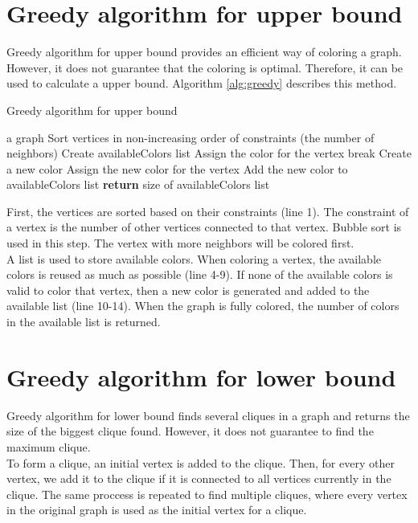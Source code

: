 \documentclass[a4paper]{report}
\begin{document}
		\section{Greedy algorithm for upper bound}
		Greedy algorithm for upper bound \cite{greedy} provides an efficient way of coloring a graph. However, it does not guarantee that the coloring is optimal. Therefore, it can be used to calculate a upper bound. Algorithm \ref{alg:greedy} describes this method.\\
		\begin{algorithm}
			\caption{Greedy algorithm for upper bound}
			\label{alg:greedy}
			\begin{algorithmic}[1]
				\REQUIRE a graph
				\STATE Sort vertices in non-increasing order of constraints (the number of neighbors)
				\STATE Create availableColors list
					\STATE Assign the color for the vertex
					\STATE break
					\ENDIF
					\ENDFOR
					\STATE Create a new color
					\STATE Assign the new color for the vertex
					\STATE Add the new color to availableColors list
					\ENDIF
				\ENDFOR
				\STATE \textbf{return} size of availableColors list
			\end{algorithmic}
		\end{algorithm}
		First, the vertices are sorted based on their constraints (line 1). The constraint of a vertex is the number of other vertices connected to that vertex. Bubble sort \cite{bubblesort2019} is used in this step. The vertex with more neighbors will be colored first.\\
		A list is used to store available colors. When coloring a vertex, the available colors is reused as much as possible (line 4-9). If none of the available colors is valid to color that vertex, then a new color is generated and added to the available list (line 10-14). When the graph is fully colored, the number of colors in the available list is returned.\\
		
		\section{Greedy algorithm for lower bound}
		Greedy algorithm for lower bound finds several cliques in a graph and returns the size of the biggest clique found. However, it does not guarantee to find the maximum clique. \\
		To form a clique, an initial vertex is added to the clique. Then, for every other vertex, we add it to the clique if it is connected to all vertices currently in the clique. The same proccess is repeated to find multiple cliques, where every vertex in the original graph is used as the initial vertex for a clique. 
		
\end{document}
